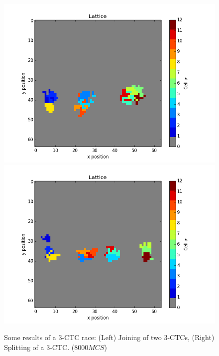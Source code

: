 \documentclass[12pt]{article}
\begin{document}
\begin{figure}[h]
	\centering
	\includegraphics[scale=0.40]{img/3CTC-join}
	\includegraphics[scale=0.40]{img/3CTC-split}
	\caption{Some results of a $3$-CTC race: (Left) Joining of two $3$-CTCs, (Right) Splitting of a $3$-CTC. ($8000MCS$)}
	\label{3CTC}
\end{figure}

\newpage



\end{document}
